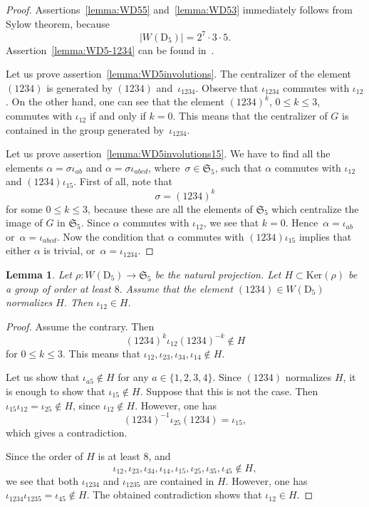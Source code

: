 \documentclass[12pt]{amsart}
\newcounter{cequation}[section]
\newtheorem{lemma}[cequation]{Lemma}
\theoremstyle{definition}
\theoremstyle{remark}
\def \le {\leqslant}
\begin{document}
\begin{proof}
Assertions~\ref{lemma:WD55} and~\ref{lemma:WD53}
immediately follows from Sylow theorem, because
$$
|W(\mathrm{D}_5)|=2^7\cdot 3\cdot 5.
$$
Assertion~\ref{lemma:WD5-1234} can be found
in~\mbox{\cite[Table 4]{Trepalin-dPfinitefield}}.

Let us prove assertion~\ref{lemma:WD5involutions}.
The centralizer of the element $(1234)$ is generated by $(1234)$
and~$\iota_{1234}$.
Observe that $\iota_{1234}$ commutes with $\iota_{12}$. On the other hand,
one can see that the element $(1234)^k$, $0\le k\le 3$,
commutes with $\iota_{12}$ if and only if $k=0$.
This means that the centralizer of $G$ is contained in the group
generated by~$\iota_{1234}$.


Let us prove assertion~\ref{lemma:WD5involutions15}. We have to find
all the elements $\alpha=\sigma \iota_{ab}$ and $\alpha=\sigma \iota_{abcd}$,
where~\mbox{$\sigma \in \mathfrak{S}_5$},
such that $\alpha$ commutes with $\iota_{12}$ and $(1234)\iota_{15}$.
First of all, note that
$$
\sigma=(1234)^k
$$
for some $0\le k\le 3$,
because these are all the elements of $\mathfrak{S}_5$ which centralize
the image of $G$ in $\mathfrak{S}_5$.
Since $\alpha$ commutes with $\iota_{12}$, we see that $k=0$.
Hence~\mbox{$\alpha=\iota_{ab}$} or~\mbox{$\alpha=\iota_{abcd}$}.
Now the condition that
$\alpha$ commutes with $(1234)\iota_{15}$ implies that either $\alpha$ is
trivial, or~\mbox{$\alpha=\iota_{1234}$}.
\end{proof}




\begin{lemma}\label{lemma:iota12}
Let $\rho\colon W(\mathrm{D}_5)\to \mathfrak{S}_5$
be the natural projection. Let $H \subset \mathrm{Ker}(\rho)$ be a group of order at least $8.$ Assume that the element $(1234) \in W(\mathrm{D}_5)$ normalizes $H.$ Then $\iota_{12} \in H.$
\end{lemma}

\begin{proof}
Assume the contrary. Then
$$
(1234)^k \iota_{12} (1234)^{-k} \notin H
$$
for $0\le k \le 3$.
This means that $\iota_{12}, \iota_{23}, \iota_{34}, \iota_{14} \notin H$.

Let us show that $\iota_{a5} \notin H$ for any $a \in \{1,2,3,4\}$.
Since $(1234)$ normalizes $H$, it is enough to show that
$\iota_{15}\notin H$. Suppose that this is not the case.
Then $\iota_{15}\iota_{12}=\iota_{25}\notin H$,
since $\iota_{12} \notin H$.
However, one has
$$
(1234)^{-1} \iota_{25} (1234)=\iota_{15},
$$
which gives a contradiction.


Since the order of $H$ is at least $8$, and
$$
\iota_{12}, \iota_{23}, \iota_{34}, \iota_{14},
\iota_{15}, \iota_{25}, \iota_{35}, \iota_{45} \notin H,
$$
we see that both $\iota_{1234}$ and $\iota_{1235}$ are contained
in $H$. However, one has
$\iota_{1234}\iota_{1235}=\iota_{45} \notin H$. The obtained contradiction
shows that $\iota_{12} \in H$.
\end{proof}
\end{document}
